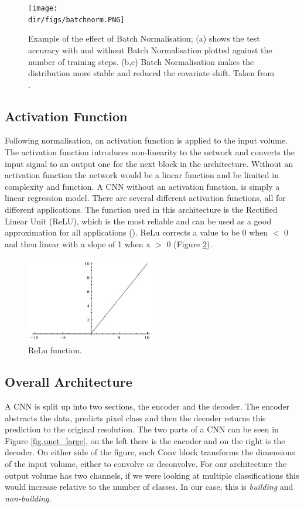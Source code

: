 \begin{figure}[htpb]
    \centering
    \texttt{[image: \\dir/figs/batchnorm.PNG]}
    \caption[Example of the effect of Batch Normalisation]{Example of the effect of Batch Normalisation; (a) shows the test accuracy with and without Batch Normalisation plotted against the number of training steps. (b,c) Batch Normalisation makes the distribution more stable and reduced the covariate shift. Taken from \citet{ioffe15}.}
    \label{fig.batchnorm}
\end{figure}
\subsection{Activation Function}
Following normalisation, an activation function is applied to the input volume. The activation function introduces non-linearity to the network and converts the input signal to an output one for the next block in the architecture. Without an activation function the network would be a linear function and be limited in complexity and function. A CNN without an activation function, is simply a linear regression model. There are several different activation functions, all for different applications. The function used in this architecture is the Rectified Linear Unit (ReLU), which is the most reliable and can be used as a good approximation for all applications (\cite{krizhevsky17}). ReLu corrects a value to be 0 when $<$ 0 and then linear with a slope of 1 when x $>$ 0 (Figure \ref{fig.reluA}). 
\par

\begin{figure}[htpb]
    \centering
    \includegraphics[width=0.5\textwidth]{Part2/chapter3/chapter/figs/relu.jpeg}
    \caption{ReLu function.}
    \label{fig.reluA}
\end{figure}
\subsection{Overall Architecture}
A CNN is split up into two sections, the encoder and the decoder. The encoder abstracts the data, predicts pixel class and then the decoder returns this prediction to the original resolution. The two parts of a CNN can be seen in Figure \ref{fig.unet_large}, on the left there is the encoder and on the right is the decoder. On either side of the figure, each Conv block transforms the dimensions of the input volume, either to convolve or deconvolve. For our architecture the output volume has two channels, if we were looking at multiple classifications this would increase relative to the number of classes. In our case, this is \textit{building} and \textit{non-building}. 

